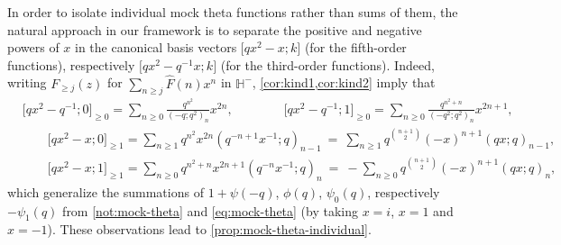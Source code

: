 \documentclass[reqno,11pt]{amsart}
\theoremstyle{definition}
\theoremstyle{remark}
\newtheorem*{remark}{Remark}
\numberwithin{equation}{section}
\renewcommand{\H}{{\mathbb{H}}}
\newcommand{\vect}[2]{\big[{#1};{#2}\big]}
\renewcommand{\hat}{\widehat}
\newcommand{\fix}[1]{\textcolor{blue}{\large (#1)\normalsize}}
\begin{document}
In order to isolate individual mock theta functions rather than sums of them, the natural approach in our framework is to separate the positive and negative powers of $x$ in the canonical basis vectors $\vect{qx^2-x}{k}$ (for the fifth-order functions), respectively $\vect{qx^2-q^{-1}x}{k}$ (for the third-order functions). Indeed, writing $F_{\ge j}(z)$ for $\sum_{n \ge j} \hat{F}(n) x^n$ in $\H^-$, \cref{cor:kind1,cor:kind2} imply that
\begin{equation} \label{eq:truncations}
\begin{aligned}
    &\vect{qx^2-q^{-1}}{0}_{\ge 0} = 
    \sum_{n \ge 0} \frac{q^{n^2}}{\left(-q; q^2\right)_n} x^{2n}
    ,
    \qquad\qquad 
    \vect{qx^2-q^{-1}}{1}_{\ge 0} = 
    \sum_{n \ge 0} \frac{q^{n^2+n}}{\left(-q^2; q^2\right)_n} x^{2n+1}
    ,
    \\
    &\qquad \vect{qx^2-x}{0}_{\ge 1} = 
    \sum_{n \ge 1} q^{n^2} x^{2n} \left(q^{-n+1} x^{-1}; q\right)_{n-1}
    \ =\
    \sum_{n \ge 1} q^{\binom{n+1}{2}} (-x)^{n+1} (qx; q)_{n-1},
    \\
    &\qquad \vect{qx^2-x}{1}_{\ge 1} =
    \sum_{n \ge 0} q^{n^2+n} x^{2n+1} \left(q^{-n} x^{-1}; q\right)_n
    \ =\
    -\sum_{n \ge 0} q^{\binom{n+1}{2}} (-x)^{n+1} (qx; q)_n,
\end{aligned}
\end{equation}
which generalize the summations of $1 + \psi(-q)$, $\phi(q)$, $\psi_0(q)$, respectively $-\psi_1(q)$ from \cref{not:mock-theta} and \cref{eq:mock-theta} (by taking $x = i$, $x = 1$ and $x = -1$). These observations lead to \cref{prop:mock-theta-individual}.

\end{document}
